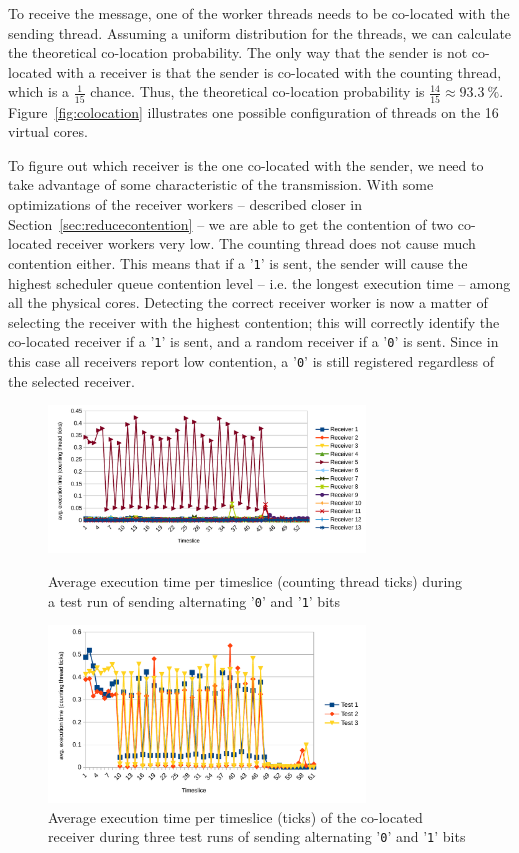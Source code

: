 \documentclass[11pt,
  titlepage=false,
  parskip=half,      %
]{scrreprt}
\begin{document}
To receive the message, one of the worker threads needs to be co-located with the sending thread.
Assuming a uniform distribution for the threads, we can calculate the theoretical co-location probability.
The only way that the sender is not co-located with a receiver is that the sender is co-located with the counting thread,
which is a $\frac{1}{15}$ chance.
Thus, the theoretical co-location probability is $\frac{14}{15} \approx 93.3~\%$.
Figure~\ref{fig:colocation} illustrates one possible configuration of threads on the 16 virtual cores.

To figure out which receiver is the one co-located with the sender,
we need to take advantage of some characteristic of the transmission.
With some optimizations of the receiver workers -- described closer in Section~\ref{sec:reducecontention} --
we are able to get the contention of two co-located receiver workers very low.
The counting thread does not cause much contention either.
This means that if a '\texttt{1}' is sent, the sender will cause the highest scheduler queue contention level -- i.e. the longest execution time --
among all the physical cores.
Detecting the correct receiver worker is now a matter of selecting the receiver with the highest contention;
this will correctly identify the co-located receiver if a '\texttt{1}' is sent, and a random receiver if a '\texttt{0}' is sent.
Since in this case all receivers report low contention, a '\texttt{0}' is still registered regardless of the selected receiver.

\begin{figure}
    \centering
    \includegraphics[width=0.75\textwidth]{figures/contentiontest}

    \caption{Average execution time per timeslice (counting thread ticks) during a test run of sending alternating '\texttt{0}' and '\texttt{1}' bits}
    \label{fig:contentiontest}
    \centering
    \includegraphics[width=0.75\textwidth]{figures/contentioncoalesced}

    \caption{Average execution time per timeslice (ticks) of the co-located receiver during three test runs of sending alternating '\texttt{0}' and '\texttt{1}' bits}
    \label{fig:contentioncoalesced}
\end{figure}
\end{document}
